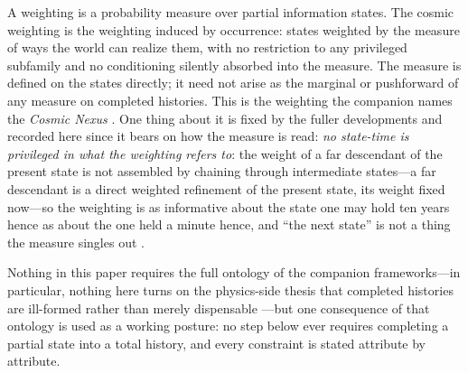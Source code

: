 \begin{definition}
A weighting is a probability measure over partial information states. The cosmic weighting is the weighting induced by occurrence: states weighted by the measure of ways the world can realize them, with no restriction to any privileged subfamily and no conditioning silently absorbed into the measure. The measure is defined on the states directly; it need not arise as the marginal or pushforward of any measure on completed histories. This is the weighting the companion names the \emph{Cosmic Nexus} \cite{Nexus}. One thing about it is fixed by the fuller developments and recorded here since it bears on how the measure is read: \emph{no state-time is privileged in what the weighting refers to}: the weight of a far descendant of the present state is not assembled by chaining through intermediate states---a far descendant is a direct weighted refinement of the present state, its weight fixed now---so the weighting is as informative about the state one may hold ten years hence as about the one held a minute hence, and ``the next state'' is not a thing the measure singles out \cite{Aethus}.
\end{definition}

Nothing in this paper requires the full ontology of the companion frameworks---in particular, nothing here turns on the physics-side thesis that completed histories are ill-formed rather than merely dispensable \cite{Aethus}---but one consequence of that ontology is used as a working posture: no step below ever requires completing a partial state into a total history, and every constraint is stated attribute by attribute.

